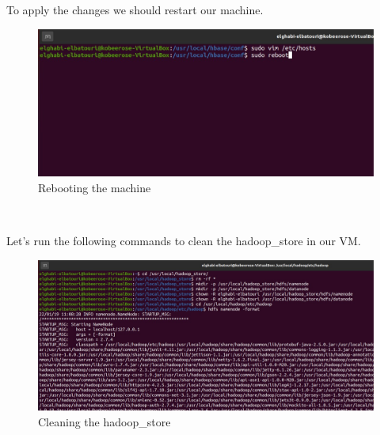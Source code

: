 \begin{spacing}{1.2}
\par To apply the changes we should restart our machine.
\\
\begin{figure}[!htb] 
\begin{center} 
\includegraphics[width=1\linewidth]{Pictures/HBase/Configuring Hbase in Standalone & Pseudo-distributed mode/Installing and Configuring Apache Hbase/rebooting the machine} 
\end{center} 
\caption{Rebooting the machine} 
\end{figure}  \FloatBarrier
\\
\newpage
\par Let's run the following commands to clean the hadoop\_store in our VM.
\\
\begin{figure}[!htb] 
\begin{center} 
\includegraphics[width=1\linewidth]{Pictures/HBase/Configuring Hbase in Standalone & Pseudo-distributed mode/Installing and Configuring Apache Hbase/Cleaning the hadoop_store} 
\end{center} 
\caption{Cleaning the hadoop\_store} 
\end{figure}  \FloatBarrier
\\


\end{spacing}
